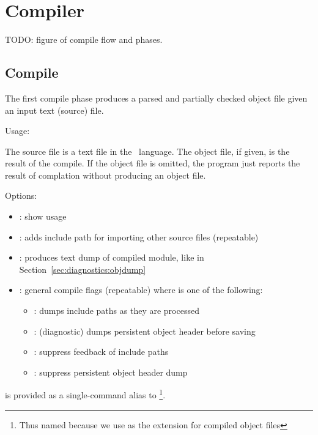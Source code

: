 
\chapter{Compiler}
\label{sec:compiler}

TODO: figure of compile flow and phases.

\section{Compile}
\label{sec:compiler:compile}

The first compile phase produces a parsed and partially checked object
file given an input text (source) file.  

Usage: \binhackt\  \ttt{[}\ttt{]}  
	\ttt{[}\ttt{]}

The source file is a text file in the \hac\ language.  
The object file, if given, is the result of the compile.  
If the object file is omitted, the program just reports the result
of complation without producing an object file.  

Options:
\begin{itemize}
\item {}: show usage
\item {}  : adds include path for importing other source files (repeatable)
\item {}: produces text dump of compiled module, like  in Section~\ref{sec:diagnostics:objdump}
\item {}  : general compile flags (repeatable) where  
	is one of the following:
\begin{itemize}
	\item {}: 
		dumps  include paths as they are processed
	\item {}: 
		(diagnostic) dumps persistent object header before saving
	\item {}: 
		suppress feedback of  include paths
	\item {}: 
		suppress persistent object header dump
\end{itemize}
\end{itemize}

 is provided as a single-command alias to 
\footnote{Thus named because we use  
as the extension for compiled object files}.


